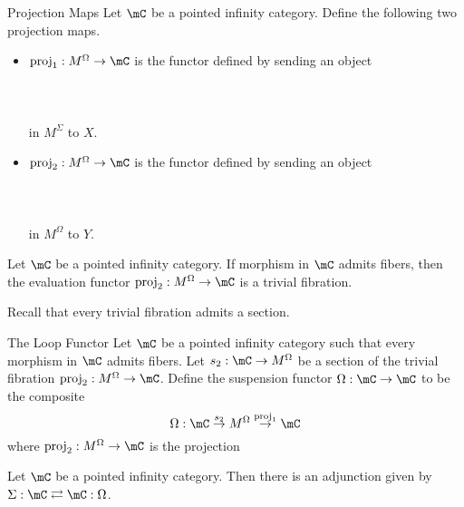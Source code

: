 \documentclass[a4paper]{article}
\begin{document}
\begin{defn}{Projection Maps}{} Let $\mC$ be a pointed infinity category. Define the following two projection maps. 
\begin{itemize}
\item $\text{proj}_1:M^\Omega\to\mC$ is the functor defined by sending an object \\~\\
\\~\\
in $M^\Sigma$ to $X$. 
\item $\text{proj}_2:M^\Omega\to\mC$ is the functor defined by sending an object \\~\\
\\~\\
in $M^\Omega$ to $Y$. 
\end{itemize}
\end{defn}

\begin{lmm}{}{} Let $\mC$ be a pointed infinity category. If morphism in $\mC$ admits fibers, then the evaluation functor $\text{proj}_2:M^\Omega\to\mC$ is a trivial fibration. 
\end{lmm}

Recall that every trivial fibration admits a section. 

\begin{defn}{The Loop Functor}{} Let $\mC$ be a pointed infinity category such that every morphism in $\mC$ admits fibers. Let $s_2:\mC\to M^\Omega$ be a section of the trivial fibration $\text{proj}_2:M^\Omega\to\mC$. Define the suspension functor $\Omega:\mC\to\mC$ to be the composite $$\Omega:\mC\overset{s_2}{\rightarrow}M^\Omega\overset{\text{proj}_1}{\rightarrow}\mC$$ where $\text{proj}_2:M^\Omega\to\mC$ is the projection 
\end{defn}

\begin{prp}{}{} Let $\mC$ be a pointed infinity category. Then there is an adjunction given by $\Sigma:\mC\rightleftarrows\mC:\Omega$. 
\end{prp}
\end{document}
